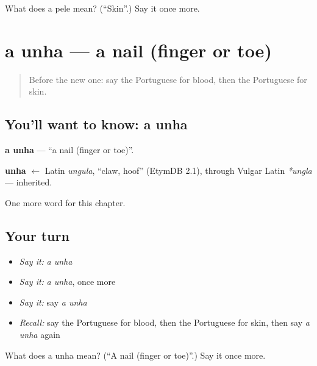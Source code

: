 \begin{tcolorbox}[breakable,colback=teal!4,colframe=teal!35!black,title={Before you move on}]
What does a pele mean? (\textquotedblleft{}Skin\textquotedblright{}.) Say it once more.
\end{tcolorbox}
\section[a unha]{a unha — a nail (finger or toe)}

\label{lesson:PT-C33-unha}



\begin{quote}
Before the new one: say the Portuguese for blood, then the Portuguese for skin.
\end{quote}

\subsection*{You'll want to know: a unha}
\textbf{a unha} — \textquotedblleft{}a nail (finger or toe)\textquotedblright{}.

\begin{cousinweb}
\textbf{unha} $\leftarrow$ Latin \emph{ungula}, \textquotedblleft{}claw, hoof\textquotedblright{} (EtymDB 2.1), through Vulgar Latin \emph{*ungla} — inherited.
\end{cousinweb}

\begin{grammarlens}[title={What you've built}]
One more word for this chapter.
\end{grammarlens}

\subsection*{Your turn}
\begin{itemize}
\raggedright
  \item \emph{Say it:} \emph{a unha}
  \item \emph{Say it:} \emph{a unha}, once more
  \item \emph{Say it:} say \emph{a unha}
  \item \emph{Recall:} say the Portuguese for blood, then the Portuguese for skin, then say \emph{a unha} again
\end{itemize}

\begin{tcolorbox}[breakable,colback=teal!4,colframe=teal!35!black,title={Before you move on}]
What does a unha mean? (\textquotedblleft{}A nail (finger or toe)\textquotedblright{}.) Say it once more.
\end{tcolorbox}
